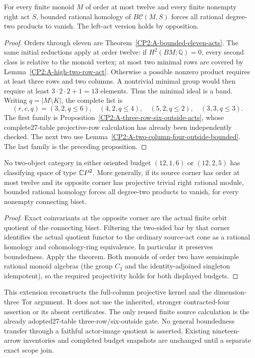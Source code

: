 \begin{theorem}
\label{CP2:A-bounded-twelve-acts}
For every finite monoid $M$ of order at most twelve and every
finite nonempty right act $S$, bounded rational homology of
$B\mathcal C(M,S)$ forces all rational degree-two products
to vanish. The left-act version holds by opposition.
\end{theorem}
\begin{proof}
Orders through eleven are Theorem~\ref{CP2:A-bounded-eleven-acts}.
The same initial reductions apply at order twelve: if
$H^2(BM;\mathbb Q)=0$, every second class is relative to the
monoid vertex; at most two minimal rows are covered by
Lemma~\ref{CP2:A-high-two-row-act}. Otherwise a possible
nonzero product requires at least three rows and two columns.
A nontrivial minimal group would then require at least
$3\cdot2\cdot2+1=13$ elements. Thus the minimal ideal is a band.
Writing $q=|M\setminus K|$, the complete list is
\[
 (r,c,q)=(3,2,q\leq6),\quad(4,2,q\leq4),\quad
 (5,2,q\leq2),\quad(3,3,q\leq3).
\]
The first family is Proposition~\ref{CP2:A-three-row-six-outside-acts},
whose complete27-table projective-row calculation has already
been independently checked. The next two use
Lemma~\ref{CP2:A-two-column-four-outside-bounded}.
The last family is the preceding proposition.
\end{proof}

\begin{corollary}
\label{CP2:A-nineteen-twelve-small-opposite}
No two-object category in either oriented budget
$(12,1,6)$ or $(12,2,5)$ has classifying space of type $\mathbb{C}P^2$.
More generally, if its source corner has order at most twelve
and its opposite corner has projective trivial right rational
module, bounded rational homology forces all degree-two products
to vanish, for every nonempty connecting biset.
\end{corollary}
\begin{proof}
Exact coinvariants at the opposite corner are the actual
finite orbit quotient of the connecting biset. Filtering the
two-sided bar by that corner identifies the actual quotient
functor to the ordinary source-act cone as a rational homology
and cohomology-ring equivalence. In particular it preserves
boundedness. Apply the theorem. Both monoids of order two
have semisimple rational monoid algebras (the group $C_2$ and
the identity-adjoined singleton idempotent), so the required
projectivity holds for both displayed budgets.
\end{proof}

\begin{remark*}
This extension reconstructs the full-column projective kernel
and the dimension-three Tor argument. It does not use the
inherited, stronger contracted-four assertion or its absent
certificates. The only reused finite source calculation is the
already adopted27-table three-row/six-outside gate. No general
boundedness transfer through a faithful actor-image quotient is
asserted. Existing nineteen-arrow inventories and completed
budget snapshots are unchanged until a separate exact scope join.
\end{remark*}
